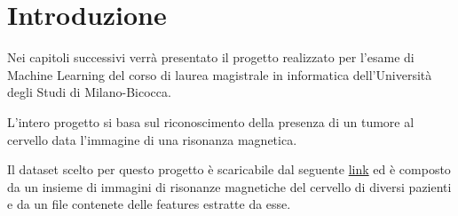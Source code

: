 \chapter{Introduzione}
Nei capitoli successivi verrà presentato il progetto realizzato per l'esame di
Machine Learning del corso di laurea magistrale in informatica dell'Università
degli Studi di Milano-Bicocca.

L'intero progetto si basa sul riconoscimento della presenza di un tumore al
cervello data l'immagine di una risonanza magnetica.

Il dataset scelto per questo progetto è scaricabile dal seguente
\href{https://www.kaggle.com/datasets/jakeshbohaju/brain-tumor/data}{link} ed è
composto da un insieme di immagini di risonanze magnetiche del cervello di
diversi pazienti e da un file contenete delle features estratte da esse.

